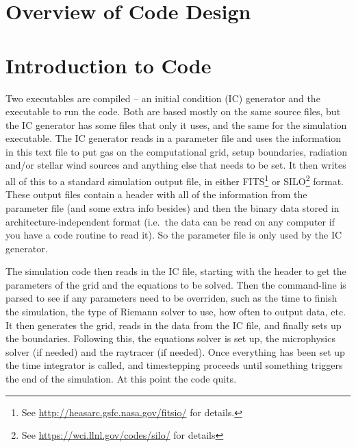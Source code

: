 \documentclass[a4paper,11pt]{report}
\begin{document}
\section{Overview of Code Design}


\section{Introduction to Code}
%

Two executables are compiled -- an initial condition (IC) generator and the executable to run the code.
Both are based mostly on the same source files, but the IC generator has some files that only it uses, and the same for the simulation executable.
The IC generator reads in a parameter file and uses the information in this text file to put gas on the computational grid, setup boundaries, radiation and/or stellar wind sources and anything else that needs to be set.
It then writes all of this to a standard simulation output file, in either FITS\footnote{See \url{http://heasarc.gsfc.nasa.gov/fitsio/} for details.} or SILO\footnote{See \url{https://wci.llnl.gov/codes/silo/} for details} format.
These output files contain a header with all of the information from the parameter file (and some extra info besides) and then the binary data stored in architecture-independent format (i.e.\ the data can be read on any computer if you have a code routine to read it).
So the parameter file is only used by the IC generator.

The simulation code then reads in the IC file, starting with the header to get the parameters of the grid and the equations to be solved.
Then the command-line is parsed to see if any parameters need to be overriden, such as the time to finish the simulation, the type of Riemann solver to use, how often to output data, etc.
It then generates the grid, reads in the data from the IC file, and finally sets up the boundaries.
Following this, the equations solver is set up, the microphysics solver (if needed) and the raytracer (if needed).
Once everything has been set up the time integrator is called, and timestepping proceeds until something triggers the end of the simulation.
At this point the code quits.
\end{document}
